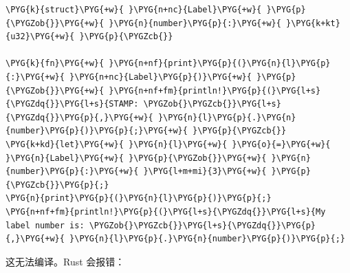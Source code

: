 \begin{Verbatim}[commandchars=\\\{\},breaklines=true,breakanywhere=true,fontsize=\codefont,xleftmargin=17bp]
\PYG{k}{struct}\PYG{+w}{ }\PYG{n+nc}{Label}\PYG{+w}{ }\PYG{p}{\PYGZob{}}\PYG{+w}{ }\PYG{n}{number}\PYG{p}{:}\PYG{+w}{ }\PYG{k+kt}{u32}\PYG{+w}{ }\PYG{p}{\PYGZcb{}}

\PYG{k}{fn}\PYG{+w}{ }\PYG{n+nf}{print}\PYG{p}{(}\PYG{n}{l}\PYG{p}{:}\PYG{+w}{ }\PYG{n+nc}{Label}\PYG{p}{)}\PYG{+w}{ }\PYG{p}{\PYGZob{}}\PYG{+w}{ }\PYG{n+nf+fm}{println!}\PYG{p}{(}\PYG{l+s}{\PYGZdq{}}\PYG{l+s}{STAMP: \PYGZob{}\PYGZcb{}}\PYG{l+s}{\PYGZdq{}}\PYG{p}{,}\PYG{+w}{ }\PYG{n}{l}\PYG{p}{.}\PYG{n}{number}\PYG{p}{)}\PYG{p}{;}\PYG{+w}{ }\PYG{p}{\PYGZcb{}}
\PYG{k+kd}{let}\PYG{+w}{ }\PYG{n}{l}\PYG{+w}{ }\PYG{o}{=}\PYG{+w}{ }\PYG{n}{Label}\PYG{+w}{ }\PYG{p}{\PYGZob{}}\PYG{+w}{ }\PYG{n}{number}\PYG{p}{:}\PYG{+w}{ }\PYG{l+m+mi}{3}\PYG{+w}{ }\PYG{p}{\PYGZcb{}}\PYG{p}{;}
\PYG{n}{print}\PYG{p}{(}\PYG{n}{l}\PYG{p}{)}\PYG{p}{;}
\PYG{n+nf+fm}{println!}\PYG{p}{(}\PYG{l+s}{\PYGZdq{}}\PYG{l+s}{My label number is: \PYGZob{}\PYGZcb{}}\PYG{l+s}{\PYGZdq{}}\PYG{p}{,}\PYG{+w}{ }\PYG{n}{l}\PYG{p}{.}\PYG{n}{number}\PYG{p}{)}\PYG{p}{;}
\end{Verbatim}

这无法编译。Rust 会报错：

